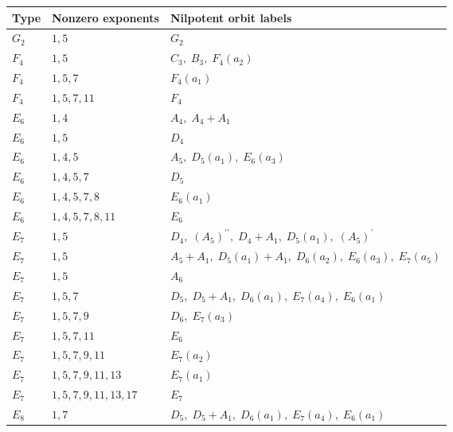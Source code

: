 \begin{longtable}{@{}lp{29mm}p{91mm}@{}}
\toprule Type&Nonzero exponents&Nilpotent orbit labels\\\midrule\endhead
$G_{2}$&$1,\allowbreak 5$&$G_{2}$\\
$F_{4}$&$1,\allowbreak 5$&$C_{3},\allowbreak\;B_{3},\allowbreak\;F_{4}(a_{2})$\\
$F_{4}$&$1,\allowbreak 5,\allowbreak 7$&$F_{4}(a_{1})$\\
$F_{4}$&$1,\allowbreak 5,\allowbreak 7,\allowbreak 11$&$F_{4}$\\
$E_{6}$&$1,\allowbreak 4$&$A_{4},\allowbreak\;A_{4}+A_{1}$\\
$E_{6}$&$1,\allowbreak 5$&$D_{4}$\\
$E_{6}$&$1,\allowbreak 4,\allowbreak 5$&$A_{5},\allowbreak\;D_{5}(a_{1}),\allowbreak\;E_{6}(a_{3})$\\
$E_{6}$&$1,\allowbreak 4,\allowbreak 5,\allowbreak 7$&$D_{5}$\\
$E_{6}$&$1,\allowbreak 4,\allowbreak 5,\allowbreak 7,\allowbreak 8$&$E_{6}(a_{1})$\\
$E_{6}$&$1,\allowbreak 4,\allowbreak 5,\allowbreak 7,\allowbreak 8,\allowbreak 11$&$E_{6}$\\
$E_{7}$&$1,\allowbreak 5$&$D_{4},\allowbreak\;(A_{5})^{\prime\prime},\allowbreak\;D_{4}+A_{1},\allowbreak\;D_{5}(a_{1}),\allowbreak\;(A_{5})^{\prime}$\\
$E_{7}$&$1,\allowbreak 5$&$A_{5}+A_{1},\allowbreak\;D_{5}(a_{1})+A_{1},\allowbreak\;D_{6}(a_{2}),\allowbreak\;E_{6}(a_{3}),\allowbreak\;E_{7}(a_{5})$\\
$E_{7}$&$1,\allowbreak 5$&$A_{6}$\\
$E_{7}$&$1,\allowbreak 5,\allowbreak 7$&$D_{5},\allowbreak\;D_{5}+A_{1},\allowbreak\;D_{6}(a_{1}),\allowbreak\;E_{7}(a_{4}),\allowbreak\;E_{6}(a_{1})$\\
$E_{7}$&$1,\allowbreak 5,\allowbreak 7,\allowbreak 9$&$D_{6},\allowbreak\;E_{7}(a_{3})$\\
$E_{7}$&$1,\allowbreak 5,\allowbreak 7,\allowbreak 11$&$E_{6}$\\
$E_{7}$&$1,\allowbreak 5,\allowbreak 7,\allowbreak 9,\allowbreak 11$&$E_{7}(a_{2})$\\
$E_{7}$&$1,\allowbreak 5,\allowbreak 7,\allowbreak 9,\allowbreak 11,\allowbreak 13$&$E_{7}(a_{1})$\\
$E_{7}$&$1,\allowbreak 5,\allowbreak 7,\allowbreak 9,\allowbreak 11,\allowbreak 13,\allowbreak 17$&$E_{7}$\\
$E_{8}$&$1,\allowbreak 7$&$D_{5},\allowbreak\;D_{5}+A_{1},\allowbreak\;D_{6}(a_{1}),\allowbreak\;E_{7}(a_{4}),\allowbreak\;E_{6}(a_{1})$\\

\end{longtable}
